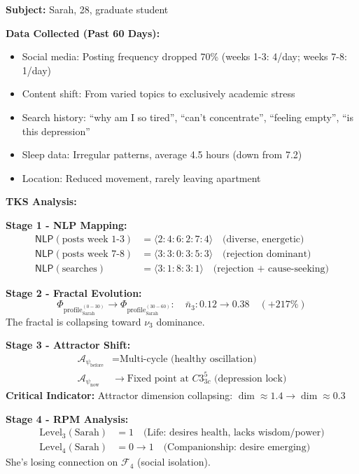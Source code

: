 \documentclass[11pt,twoside]{book}
\newcommand{\noe}[1]{\nu_{#1}}
\newcommand{\Foundations}{\mathcal{F}}
\newcommand{\PsychAttractor}{\mathcal{A}_\psi}
\newcommand{\NLP}{\mathsf{NLP}}
\newcommand{\ProfileFrac}{\Phi_{\mathrm{profile}}}
\begin{document}
\begin{tcolorbox}[colback=yellow!5!white,colframe=yellow!65!black,title=\textbf{Scenario: Early Detection of Sarah's Crisis},breakable]

\textbf{Subject:} Sarah, 28, graduate student

\textbf{Data Collected (Past 60 Days):}
\begin{itemize}
    \item Social media: Posting frequency dropped 70\% (weeks 1-3: 4/day; weeks 7-8: 1/day)
    \item Content shift: From varied topics to exclusively academic stress
    \item Search history: ``why am I so tired'', ``can't concentrate'', ``feeling empty'', ``is this depression''
    \item Sleep data: Irregular patterns, average 4.5 hours (down from 7.2)
    \item Location: Reduced movement, rarely leaving apartment
\end{itemize}

\textbf{TKS Analysis:}

\textbf{Stage 1 - NLP Mapping:}
\begin{align*}
    \NLP(\text{posts week 1-3}) &= \langle 2:4:6:2:7:4 \rangle \quad \text{(diverse, energetic)} \\
    \NLP(\text{posts week 7-8}) &= \langle 3:3:0:3:5:3 \rangle \quad \text{(rejection dominant)} \\
    \NLP(\text{searches}) &= \langle 3:1:8:3:1 \rangle \quad \text{(rejection + cause-seeking)}
\end{align*}

\textbf{Stage 2 - Fractal Evolution:}
\[
    \ProfileFrac_{\text{Sarah}}^{(0-30)} \to \ProfileFrac_{\text{Sarah}}^{(30-60)} : \quad
    \bar{n}_3 : 0.12 \to 0.38 \quad (+217\%)
\]
The fractal is collapsing toward $\noe{3}$ dominance.

\textbf{Stage 3 - Attractor Shift:}
\begin{align*}
    \PsychAttractor_{\text{before}} &= \text{Multi-cycle (healthy oscillation)} \\
    \PsychAttractor_{\text{now}} &\to \text{Fixed point at } C3^5_{3c} \text{ (depression lock)}
\end{align*}
\textbf{Critical Indicator:} Attractor dimension collapsing: $\dim \approx 1.4 \to \dim \approx 0.3$

\textbf{Stage 4 - RPM Analysis:}
\begin{align*}
    \mathrm{Level}_3(\text{Sarah}) &= 1 \quad \text{(Life: desires health, lacks wisdom/power)} \\
    \mathrm{Level}_4(\text{Sarah}) &= 0 \to 1 \quad \text{(Companionship: desire emerging)}
\end{align*}
She's losing connection on $\Foundations_4$ (social isolation).


\end{tcolorbox}
\end{document}
